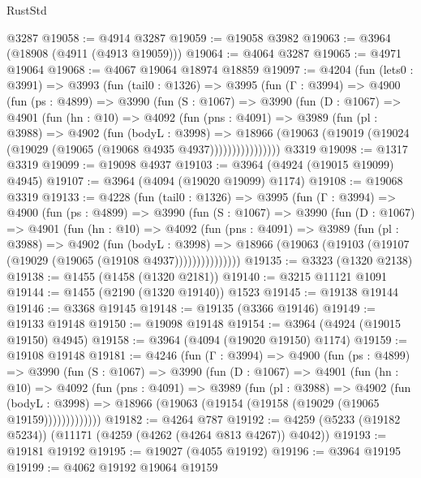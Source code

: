 \begin{lexlean}{RustStd}
\begin{coremodule}
{\begin{coremodule}
{{{{{{{{{{{{{{{{{{{{{{{{{{{{{{{{{{{{{{    @3287
@19058 := @4914 @3287
@19059 := @19058 @3982
@19063 := @3964 (@18908 (@4911 (@4913 @19059)))
@19064 := @4064 @3287
@19065 := @4971 @19064
@19068 := @4067 @19064 @18974 @18859
@19097 := @4204
    (fun (lets0 : @3991) =>
    @3993
      (fun (tail0 : @1326) =>
      @3995
        (fun (Γ : @3994) =>
        @4900
          (fun (ps : @4899) =>
          @3990
            (fun (S : @1067) =>
            @3990
              (fun (D : @1067) =>
              @4901
                (fun (hn : @10) =>
                @4092
                  (fun (pns : @4091) =>
                  @3989
                    (fun (pl : @3988) =>
                    @4902
                      (fun (bodyL : @3998) =>
                      @18966
                        (@19063 (@19019 (@19024 (@19029 (@19065 (@19068 @4935 @4937))))))))))))))))
    @3319
@19098 := @1317 @3319
@19099 := @19098 @4937
@19103 := @3964 (@4924 (@19015 @19099) @4945)
@19107 := @3964 (@4094 (@19020 @19099) @1174)
@19108 := @19068 @3319
@19133 := @4228
    (fun (tail0 : @1326) =>
    @3995
      (fun (Γ : @3994) =>
      @4900
        (fun (ps : @4899) =>
        @3990
          (fun (S : @1067) =>
          @3990
            (fun (D : @1067) =>
            @4901
              (fun (hn : @10) =>
              @4092
                (fun (pns : @4091) =>
                @3989
                  (fun (pl : @3988) =>
                  @4902
                    (fun (bodyL : @3998) =>
                    @18966 (@19063 (@19103 (@19107 (@19029 (@19065 (@19108 @4937)))))))))))))))
@19135 := @3323 (@1320 @2138)
@19138 := @1455 (@1458 (@1320 @2181))
@19140 := @3215 @11121 @1091
@19144 := @1455 (@2190 (@1320 @19140)) @1523
@19145 := @19138 @19144
@19146 := @3368 @19145
@19148 := @19135 (@3366 @19146)
@19149 := @19133 @19148
@19150 := @19098 @19148
@19154 := @3964 (@4924 (@19015 @19150) @4945)
@19158 := @3964 (@4094 (@19020 @19150) @1174)
@19159 := @19108 @19148
@19181 := @4246
    (fun (Γ : @3994) =>
    @4900
      (fun (ps : @4899) =>
      @3990
        (fun (S : @1067) =>
        @3990
          (fun (D : @1067) =>
          @4901
            (fun (hn : @10) =>
            @4092
              (fun (pns : @4091) =>
              @3989
                (fun (pl : @3988) =>
                @4902
                  (fun (bodyL : @3998) =>
                  @18966 (@19063 (@19154 (@19158 (@19029 (@19065 @19159)))))))))))))
@19182 := @4264 @787
@19192 := @4259 (@5233 (@19182 @5234)) (@11171 (@4259 (@4262 (@4264 @813 @4267)) @4042))
@19193 := @19181 @19192
@19195 := @19027 (@4055 @19192)
@19196 := @3964 @19195
@19199 := @4062 @19192 @19064 @19159
}}}}}}}}}}}}}}}}}}}}}}}}}}}}}}}}}}}}}}
\end{coremodule}}
\end{coremodule}
\end{lexlean}
